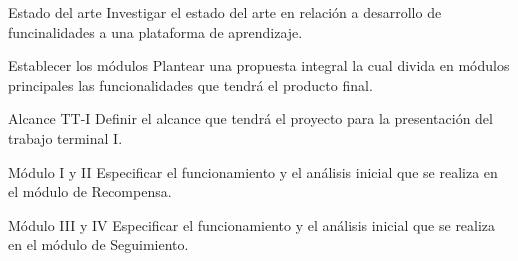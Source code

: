 
\begin{Actividad}{Estado del arte}{%
    Investigar el estado del arte en relación a desarrollo de funcinalidades a una plataforma de aprendizaje.}
    \PBitem {}%
\end{Actividad}


\begin{Actividad}{Establecer los módulos}{%
    Plantear una propuesta integral la cual divida en módulos principales las funcionalidades que tendrá el producto final.}
    \PBitem {}%
\end{Actividad}

\pagebreak

\begin{Actividad}{Alcance TT-I}{%
    Definir el alcance que tendrá el proyecto para la presentación del trabajo terminal I.}
    \PBitem {}%
\end{Actividad}


\begin{Actividad}{Módulo I y II}{%
    Especificar el funcionamiento y el análisis inicial que se realiza en el módulo de Recompensa.}
    \PBitem {}%
\end{Actividad}


\begin{Actividad}{Módulo III y IV}{%
    Especificar el funcionamiento y el análisis inicial que se realiza en el módulo de Seguimiento.}
    \PBitem {}%
\end{Actividad}

